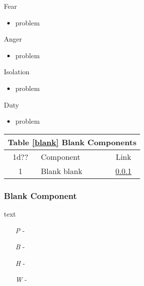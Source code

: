 \documentclass[a4paper]{article}
\begin{document}
\vspace{0.3cm}
\begin{minipage}[t]{0.4\linewidth}
Fear
\begin{itemize}
\item problem
\end{itemize}
\end{minipage} 
\begin{minipage}[t]{0.4\linewidth}
Anger
\begin{itemize}
\item problem
\end{itemize}
\end{minipage}

\begin{minipage}[t]{0.4\linewidth}
Isolation
\begin{itemize}
\item problem
\end{itemize}
\end{minipage}
\begin{minipage}[t]{0.4\linewidth}
Duty
\begin{itemize}
\item problem
\end{itemize}
\end{minipage}

\vspace{0.5cm} \hspace{0.25\linewidth}
\begin{tabular}{@{} | c | l | c | @{}}
\toprule
\multicolumn{3}{|l|}{Table \ref{blank} Blank Components} \\
\toprule
1d?? & Component & Link \\
\midrule
1 & Blank blank & \ref{blank_blank} \\
\bottomrule
\end{tabular}

\hspace{-18pt} \subsubsection{Blank Component} \label{blank_blank} \vspace{-0.2cm}
text
\begin{enumerate}
\item [\textit{P}] - 
\item [\textit{B}] - 
\item [\textit{H}] - 
\item [\textit{W}] - 
\end{enumerate}
\end{document}
